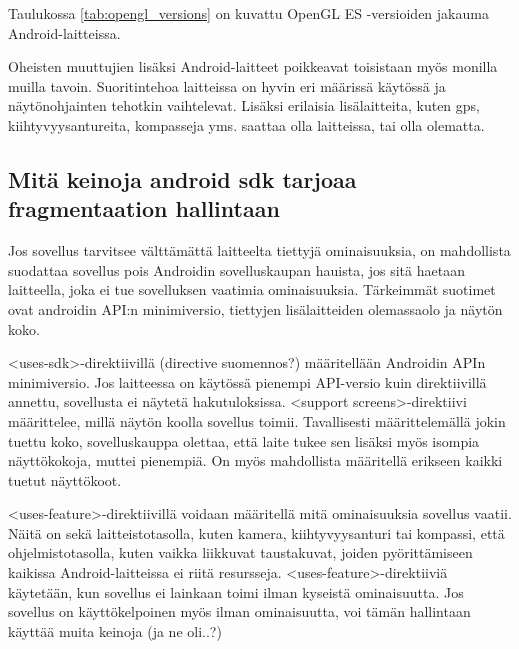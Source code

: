 Taulukossa \ref{tab:opengl_versions} on kuvattu OpenGL ES -versioiden jakauma Android-laitteissa.\cite{android_versions}

Oheisten muuttujien lisäksi Android-laitteet poikkeavat toisistaan myös monilla muilla tavoin. Suoritintehoa laitteissa on hyvin eri määrissä käytössä ja näytönohjainten tehotkin vaihtelevat. Lisäksi erilaisia lisälaitteita, kuten gps, kiihtyvyysantureita, kompasseja yms. saattaa olla laitteissa, tai olla olematta.

\subsection{Mitä keinoja android sdk tarjoaa fragmentaation hallintaan}

Jos sovellus tarvitsee välttämättä laitteelta tiettyjä ominaisuuksia, on mahdollista suodattaa sovellus pois Androidin sovelluskaupan hauista, jos sitä haetaan laitteella, joka ei tue sovelluksen vaatimia ominaisuuksia. Tärkeimmät suotimet ovat androidin API:n minimiversio, tiettyjen lisälaitteiden olemassaolo ja näytön koko.

<uses-sdk>-direktiivillä (directive suomennos?) määritellään Androidin APIn minimiversio. Jos laitteessa on käytössä pienempi API-versio kuin direktiivillä annettu, sovellusta ei näytetä hakutuloksissa. <support screens>-direktiivi määrittelee, millä näytön koolla sovellus toimii. Tavallisesti määrittelemällä jokin tuettu koko, sovelluskauppa olettaa, että laite tukee sen lisäksi myös isompia näyttökokoja, muttei pienempiä. On myös mahdollista määritellä erikseen kaikki tuetut näyttökoot.

<uses-feature>-direktiivillä voidaan määritellä mitä ominaisuuksia sovellus vaatii. Näitä on sekä laitteistotasolla, kuten kamera, kiihtyvyysanturi tai kompassi, että ohjelmistotasolla, kuten vaikka liikkuvat taustakuvat, joiden pyörittämiseen kaikissa Android-laitteissa ei riitä resursseja. <uses-feature>-direktiiviä käytetään, kun sovellus ei lainkaan toimi ilman kyseistä ominaisuutta. Jos sovellus on käyttökelpoinen myös ilman ominaisuutta, voi tämän hallintaan käyttää muita keinoja (ja ne oli..?)  \cite{android_compatibility}
